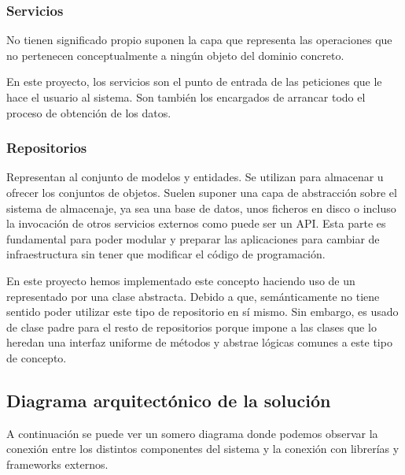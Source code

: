 \subsubsection{Servicios}
No tienen significado propio suponen la capa que representa las operaciones que no pertenecen conceptualmente a ningún objeto del dominio concreto. 

En este proyecto, los servicios son el punto de entrada de las peticiones que le hace el usuario al sistema. Son también los encargados de arrancar todo el proceso de obtención de los datos.

\subsubsection{Repositorios}
Representan al conjunto de modelos y entidades. Se utilizan para almacenar u ofrecer los conjuntos de objetos. Suelen suponer una capa de abstracción sobre el sistema de almacenaje, ya sea una base de datos, unos ficheros en disco o incluso la invocación de otros servicios externos como puede ser un API. Esta parte es fundamental para poder modular y preparar las aplicaciones para cambiar de infraestructura sin tener que modificar el código de programación.

En este proyecto hemos implementado este concepto haciendo uso de un  representado por una clase abstracta. Debido a que, semánticamente no tiene sentido poder utilizar este tipo de repositorio en sí mismo. Sin embargo, es usado de clase padre para el resto de repositorios porque impone a las clases que lo heredan una interfaz uniforme de métodos y abstrae lógicas comunes a este tipo de concepto.


\subsection{Diagrama arquitectónico de la solución}
A continuación se puede ver un somero diagrama donde podemos observar la conexión entre los distintos componentes del sistema y la conexión con librerías y frameworks externos. 

